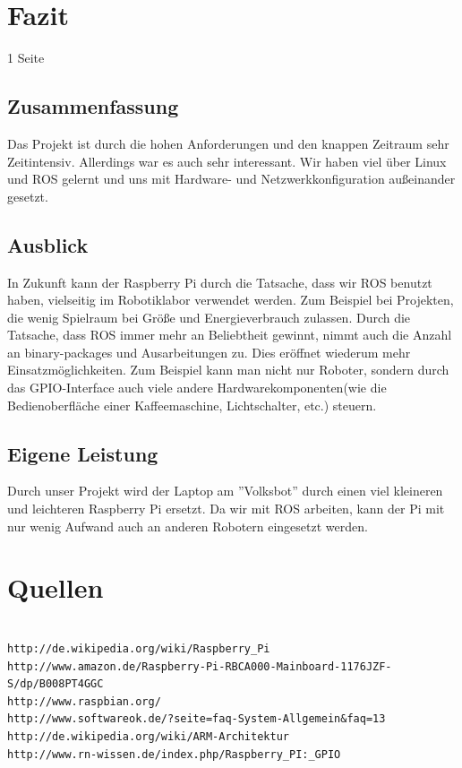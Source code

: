 \documentclass[12pt]{article}
\begin{document}
\section{Fazit}
1 Seite
\subsection{Zusammenfassung}

Das Projekt ist durch die hohen Anforderungen und den knappen Zeitraum sehr Zeitintensiv. Allerdings war es auch sehr interessant. Wir haben viel über Linux und ROS gelernt und uns mit Hardware- und Netzwerkkonfiguration außeinander gesetzt.


\subsection{Ausblick}

In Zukunft kann der Raspberry Pi durch die Tatsache, dass wir ROS benutzt haben, vielseitig im Robotiklabor verwendet werden. Zum Beispiel bei Projekten, die wenig Spielraum bei Größe und Energieverbrauch zulassen.
Durch die Tatsache, dass ROS immer mehr an Beliebtheit gewinnt, nimmt auch die Anzahl an binary-packages und Ausarbeitungen zu. Dies eröffnet wiederum mehr Einsatzmöglichkeiten.
Zum Beispiel kann man nicht nur Roboter, sondern durch das GPIO-Interface auch viele andere Hardwarekomponenten(wie die Bedienoberfläche einer Kaffeemaschine, Lichtschalter, etc.) steuern.  


\subsection{Eigene Leistung}

Durch unser Projekt wird der Laptop am ''Volksbot'' durch einen viel kleineren und leichteren Raspberry Pi ersetzt. Da wir mit ROS arbeiten, kann der Pi mit nur wenig Aufwand auch an anderen Robotern eingesetzt werden.

\section{Quellen}
\begin{verbatim}

http://de.wikipedia.org/wiki/Raspberry_Pi
http://www.amazon.de/Raspberry-Pi-RBCA000-Mainboard-1176JZF-S/dp/B008PT4GGC
http://www.raspbian.org/
http://www.softwareok.de/?seite=faq-System-Allgemein&faq=13
http://de.wikipedia.org/wiki/ARM-Architektur
http://www.rn-wissen.de/index.php/Raspberry_PI:_GPIO

\end{verbatim}
\end{document}
